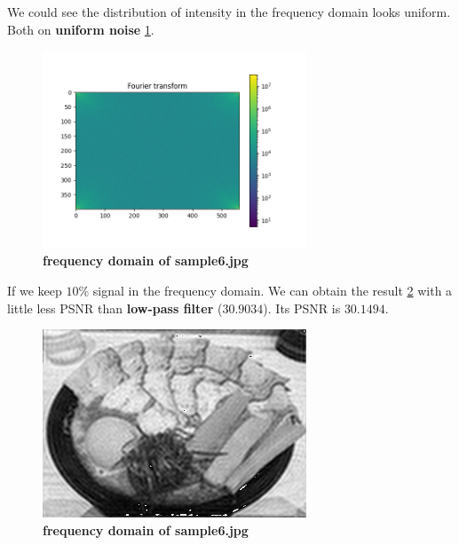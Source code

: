 We could see the distribution of intensity in the frequency domain looks uniform. Both on \textbf{uniform noise} \cref{fig3_8fft_orig}.
\begin{figure}
  \centering
  \includegraphics[width=0.7\textwidth]{image/tmp/sample6_FD_origin.png}
  \caption{\textbf{frequency domain of \textbf{sample6.jpg}}}
  \label{fig3_8fft_orig}
\end{figure}
If we keep $10$\% signal in the frequency domain. We can obtain the result \cref{fig3_8fft} with a little less PSNR than \textbf{low-pass filter} ($30.9034$). Its PSNR is $30.1494$.
\begin{figure}
  \centering
  \includegraphics[width=0.7\textwidth]{image/tmp/8_result_fft.jpg}
  \caption{\textbf{frequency domain of \textbf{sample6.jpg}}}
  \label{fig3_8fft}
\end{figure}
